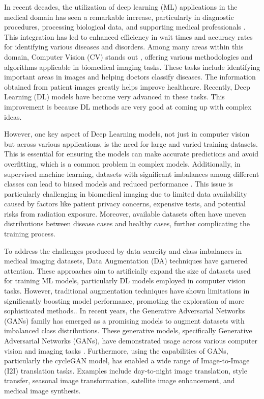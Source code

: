 \documentclass[UKenglish,12pt]{master-style}
\begin{document}
In recent decades, the utilization of deep learning (ML) applications in the medical domain has seen a remarkable increase, particularly in diagnostic procedures, processing biological data, and supporting medical professionals \cite{Shad_2021}. This integration has led to enhanced efficiency in wait times and accuracy rates for identifying various diseases and disorders. Among many areas within this domain, Computer Vision (CV) stands out , offering various methodologies and algorithms applicable in biomedical imaging tasks. These tasks include identifying important areas in images and helping doctors classify diseases. The information obtained from patient images greatly helps improve healthcare. Recently, Deep Learning (DL) models have become very advanced in these tasks. This improvement is because DL methods are very good at coming up with complex ideas.

However, one key aspect of Deep Learning models, not just in computer vision but across various applications, is the need for large and varied training datasets. This is essential for ensuring the models can make accurate predictions and avoid overfitting, which is a common problem in complex models. Additionally, in supervised machine learning, datasets with significant imbalances among different classes can lead to biased models and reduced performance \cite{RASHIDI20192374289519873088} . This issue is particularly challenging in biomedical imaging due to limited data availability caused by factors like patient privacy concerns, expensive tests, and potential risks from radiation exposure. Moreover, available datasets often have uneven distributions between disease cases and healthy cases, further complicating the training process. 

To address the challenges produced by data scarcity and class imbalances in medical imaging datasets, Data Augmentation (DA) techniques have garnered attention. These approaches aim to artificially expand the size of datasets used for training ML models, particularly DL models employed in computer vision tasks. However, traditional augmentation techniques have shown limitations in significantly boosting model performance, promoting the exploration of more sophisticated methods.\cite{MUMUNI2022100258}.
In recent years, the Generative Adversarial Networks (GANs) family has emerged as a promising models to augment datasets with imbalanced class distributions. These generative models, specifically Generative Adversarial Networks (GANs), have demonstrated usage across various computer vision and imaging tasks \cite{10.1007/978-3-031-45673-2}. Furthermore, using the capabilities of GANs, particularly the cycleGAN model, has enabled a wide range of Image-to-Image (I2I) translation tasks. Examples include day-to-night image translation, style transfer, seasonal image transformation, satellite image enhancement, and medical image synthesis. 
\end{document}
